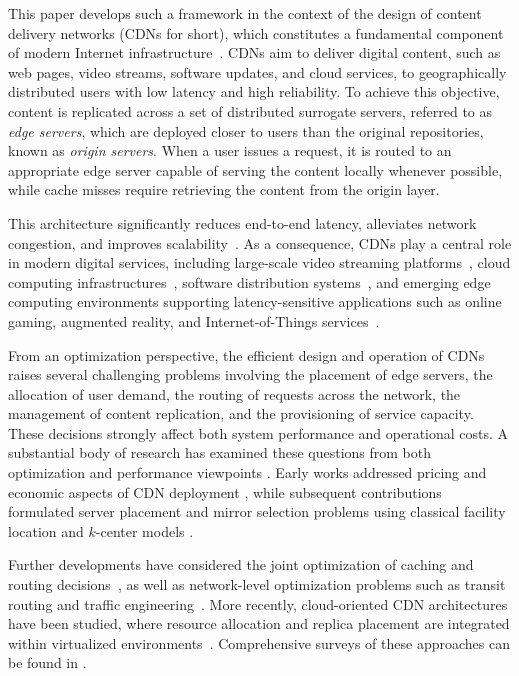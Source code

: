 \documentclass[a4paper,11pt,reqno]{amsart}
\begin{document}
This paper develops such a framework in the context of the design of content delivery networks (CDNs for short), which constitutes a fundamental component of modern Internet infrastructure~\citep{pallis2006insight,verma2003cdn}. CDNs aim to deliver digital content, such as web pages, video streams, software updates, and cloud services, to geographically distributed users with low latency and high reliability. To achieve this objective, content is replicated across a set of distributed surrogate servers, referred to as \emph{edge servers}, which are deployed closer to users than the original repositories, known as \emph{origin servers}. When a user issues a request, it is routed to an appropriate edge server capable of serving the content locally whenever possible, while cache misses require retrieving the content from the origin layer.

This architecture significantly reduces end-to-end latency, alleviates network congestion, and improves scalability~\citep{liu2012optimizing}. As a consequence, CDNs play a central role in modern digital services, including large-scale video streaming platforms~\citep{ghabashneh2020exploring,krishnappa_optimizing_2015}, cloud computing infrastructures~\citep{ling2013cdn}, software distribution systems~\citep{nygren2010akamai}, and emerging edge computing environments supporting latency-sensitive applications such as online gaming, augmented reality, and Internet-of-Things services~\citep{aral2019addressing,george2021evolution}.

From an optimization perspective, the efficient design and operation of CDNs raises several challenging problems involving the placement of edge servers, the allocation of user demand, the routing of requests across the network, the management of content replication, and the provisioning of service capacity. These decisions strongly affect both system performance and operational costs. A substantial body of research has examined these questions from both optimization and performance viewpoints \citep{verma2003cdn,buyya_content_2008,pallis2006insight,nygren2010akamai}. Early works addressed pricing and economic aspects of CDN deployment \citep{hosanagar_service_2008}, while subsequent contributions formulated server placement and mirror selection problems using classical facility location and $k$-center models \citep{hillmann_modeling_2016}. 

Further developments have considered the joint optimization of caching and routing decisions~\citep{poularakis_video_2014,guo_joint_2019,ghabashneh2020exploring}, as well as network-level optimization problems such as transit routing and traffic engineering~\citep{liu2012optimizing,ahmed_optimizing_2018}. More recently, cloud-oriented CDN architectures have been studied, where resource allocation and replica placement are integrated within virtualized environments~\citep{papagianni_cloud-oriented_2013,ling2013cdn}. Comprehensive surveys of these approaches can be found in \cite{salahuddin_survey_2018,pathan_taxonomy_2007}.
\end{document}
